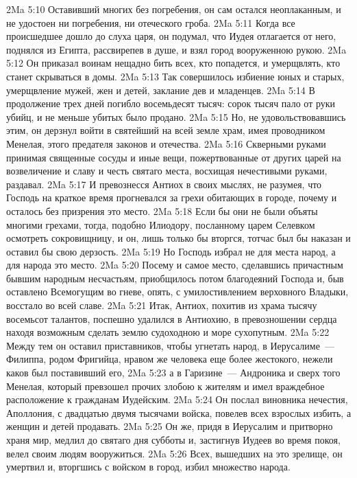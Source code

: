 \vs 2Ma 5:10 Оставивший многих без погребения, он сам остался неоплаканным, и не удостоен ни погребения, ни отеческого гроба.
\rsbpar\vs 2Ma 5:11 Когда все происшедшее дошло до слуха царя, он подумал, что Иудея отлагается от него, поднялся из Египта, рассвирепев в душе, и взял город вооруженною рукою.
\vs 2Ma 5:12 Он приказал воинам нещадно бить всех, кто попадется, и умерщвлять, кто станет скрываться в домы.
\vs 2Ma 5:13 Так совершилось избиение юных и старых, умерщвление мужей, жен и детей, заклание дев и младенцев.
\vs 2Ma 5:14 В продолжение трех дней погибло восемьдесят тысяч: сорок тысяч пало от руки убийц, и не меньше убитых было продано.
\vs 2Ma 5:15 Но, не удовольствовавшись этим, он дерзнул войти в святейший на всей земле храм, имея проводником Менелая, этого предателя законов и отечества.
\vs 2Ma 5:16 Скверными руками принимая священные сосуды и иные вещи, пожертвованные от других царей на возвеличение и славу и честь святаго места, восхищая нечестивыми руками, раздавал.
\vs 2Ma 5:17 И превознесся Антиох в своих мыслях, не разумея, что Господь на краткое время прогневался за грехи обитающих в городе, почему и осталось без призрения это место.
\vs 2Ma 5:18 Если бы они не были объяты многими грехами, тогда, подобно Илиодору, посланному царем Селевком осмотреть сокровищницу, и он, лишь только бы вторгся, тотчас был бы наказан и оставил бы свою дерзость.
\vs 2Ma 5:19 Но Господь избрал не для места народ, а для народа это место.
\vs 2Ma 5:20 Посему и самое место, сделавшись причастным бывшим народным несчастьям, приобщилось потом благодеяний Господа и, быв оставлено Всемогущим во гневе, опять, с умилостивлением верховного Владыки, восстало во всей славе.
\rsbpar\vs 2Ma 5:21 Итак, Антиох, похитив из храма тысячу восемьсот талантов, поспешно удалился в Антиохию, в превозношении сердца находя возможным сделать землю судоходною и море сухопутным.
\vs 2Ma 5:22 Между тем он оставил приставников, чтобы угнетать народ, в Иерусалиме~--- Филиппа, родом Фригийца, нравом же человека еще более жестокого, нежели каков был поставивший его,
\vs 2Ma 5:23 а в Гаризине~--- Андроника и сверх того Менелая, который превзошел прочих злобою к жителям и имел враждебное расположение к гражданам Иудейским.
\vs 2Ma 5:24 Он послал виновника нечестия, Аполлония, с двадцатью двумя тысячами войска, повелев всех взрослых избить, а женщин и детей продавать.
\vs 2Ma 5:25 Он же, придя в Иерусалим и притворно храня мир, медлил до святаго дня субботы и, застигнув Иудеев во время покоя, велел своим людям вооружиться.
\vs 2Ma 5:26 Всех, вышедших на это зрелище, он умертвил и, вторгшись с войском в город, избил множество народа.
